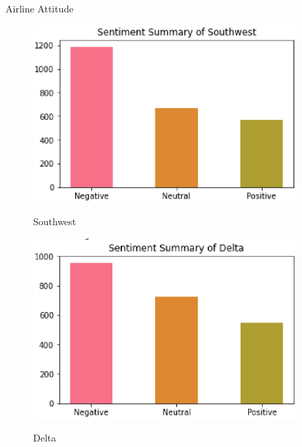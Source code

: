\documentclass[
 size=14pt,
 paper=smartboard,  %
 mode=present, 		%
 display=slides, 	%
 style=tuliplab,  	%
 pauseslide,
 fleqn,leqno]{powerdot}
\begin{document}
\begin{slide}{Airline Attitude}
  \begin{figure}[htbp]
    \centering
    \begin{minipage}[t]{0.48\textwidth}
      \centering
      \includegraphics[width=0.9\textwidth]{figures//southwest.eps}\\
      \vspace{-1.4em}
      \caption{Southwest}
    \end{minipage}
    \begin{minipage}[t]{0.48\textwidth}
      \centering
      \includegraphics[width=0.9\textwidth]{figures//delta.eps}\\
      \vspace{-1.4em}
      \caption{Delta}
    \end{minipage}
  \end{figure}
\end{slide}
\end{document}
